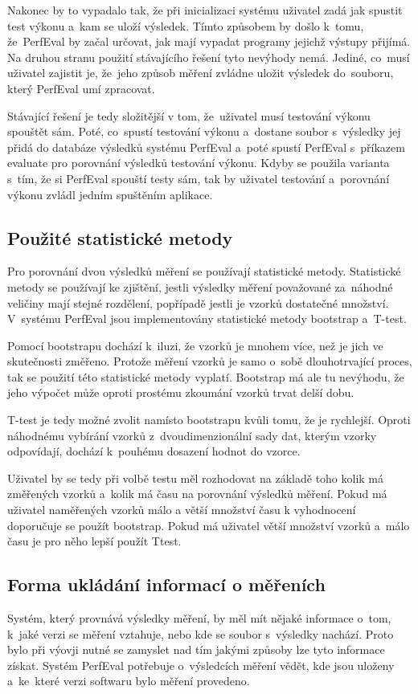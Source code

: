 Nakonec by to vypadalo tak, že při inicializaci systému uživatel zadá jak spustit test výkonu a~kam se uloží výsledek.
Tímto způsobem by došlo k~tomu, že~PerfEval by začal určovat, jak mají vypadat programy jejichž výstupy přijímá.
Na druhou stranu použití stávajícího řešení tyto nevýhody nemá. Jediné, co~musí uživatel zajistit je, že~jeho
způsob měření zvládne uložit výsledek do~souboru, který PerfEval umí zpracovat.

Stávající řešení je tedy složitější v tom, že~uživatel musí testování výkonu spouštět sám. Poté, co~spustí testování
výkonu a~dostane soubor s~výsledky jej přidá do databáze výsledků systému PerfEval a~poté spustí PerfEval s~příkazem evaluate
pro porovnání výsledků testování výkonu. Kdyby se použila varianta s~tím, že si PerfEval spouští testy sám, tak
by uživatel testování a~porovnání výkonu zvládl jedním spuštěním aplikace.

\subsection{Použité statistické metody}
Pro porovnání dvou výsledků měření se používají statistické metody. Statistické metody se používají ke zjištění,
jestli výsledky měření považované za~náhodné veličiny mají stejné rozdělení, popřípadě jestli je vzorků dostatečné množství.
V~systému PerfEval jsou implementovány statistické metody bootstrap a~T-test.

Pomocí bootstrapu dochází k~iluzi, že vzorků je mnohem více, než je jich ve skutečnosti změřeno. Protože měření vzorků
je samo o~sobě dlouhotrvající proces, tak se použití této statistické metody vyplatí. Bootstrap má ale tu nevýhodu, že jeho výpočet
může oproti prostému zkoumání vzorků trvat delší dobu.

T-test je tedy možné zvolit namísto bootstrapu kvůli tomu, že je rychlejší. Oproti náhodnému vybírání vzorků z~dvoudimenzionální sady
dat, kterým vzorky odpovídají, dochází k~pouhému dosazení hodnot do vzorce.

Uživatel by se tedy při volbě testu měl rozhodovat na základě toho kolik má změřených vzorků a~kolik má času na porovnání
výsledků měření. Pokud má uživatel naměřených vzorků málo a větší množství času k vyhodnocení doporučuje se použít bootstrap.
Pokud má uživatel větší množství vzorků a~málo času je pro něho lepší použít T\-test.

\subsection{Forma ukládání informací o měřeních}
Systém, který provnává výsledky měření, by měl mít nějaké informace o~tom, k~jaké verzi se měření vztahuje, nebo kde
se soubor s~výsledky nachází. Proto bylo při výovji nutné se zamyslet nad tím jakými způsoby lze tyto informace získat.
Systém PerfEval potřebuje o~výsledcích měření vědět, kde jsou uloženy a~ke~které verzi softwaru bylo měření provedeno.


